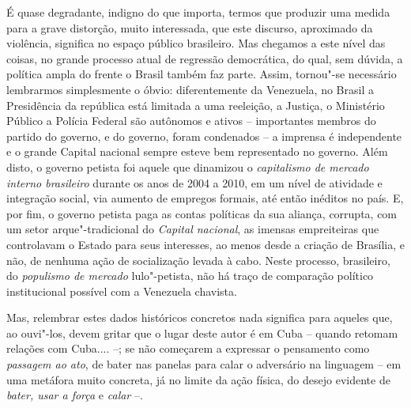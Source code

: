 É quase degradante, indigno do que importa, termos que produzir uma
medida para a grave distorção, muito interessada, que este discurso,
aproximado da violência, significa no espaço público brasileiro. Mas
chegamos a este nível das coisas, no grande processo atual de regressão
democrática, do qual, sem dúvida, a política ampla do  frente o Brasil
também faz parte. Assim, tornou"-se necessário lembrarmos simplesmente o
óbvio: diferentemente da Venezuela, no Brasil a Presidência da república
está limitada a uma reeleição, a Justiça, o Ministério Público a Polícia
Federal são autônomos e ativos -- importantes membros do partido do
governo, e do governo, foram condenados -- a imprensa é independente e o
grande Capital nacional sempre esteve bem representado no governo. Além
disto, o governo petista foi aquele que dinamizou o \emph{capitalismo de
mercado interno brasileiro} durante os anos de 2004 a 2010, em um nível
de atividade e integração social, via aumento de empregos formais, até
então inéditos no país. E, por fim, o governo petista paga as contas
políticas da sua aliança, corrupta, com um setor arque"-tradicional do
\emph{Capital nacional}, as imensas empreiteiras que controlavam o
Estado para seus interesses, ao menos desde a criação de Brasília, e
não, de nenhuma ação de socialização levada à cabo. Neste processo,
brasileiro, do \emph{populismo de mercado} lulo"-petista, não há traço de
comparação político institucional possível com a Venezuela chavista.

Mas, relembrar estes dados históricos concretos nada significa para
aqueles que, ao ouvi"-los, devem gritar que o lugar deste autor é em Cuba
-- quando  retomam relações com Cuba.... --; se não começarem a
expressar o pensamento como \emph{passagem ao ato}, de bater nas panelas
para calar o adversário na linguagem -- em uma metáfora muito concreta,
já no limite da ação física, do desejo evidente de \emph{bater, usar a
força} e \emph{calar} --.

